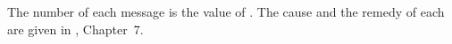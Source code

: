 {\fontsize{7.5}{9}\selectfont\noindent The number of each message is the value
of .  The cause and the remedy of each are given in
, Chapter~7.\par}
\vspace{3pt}

